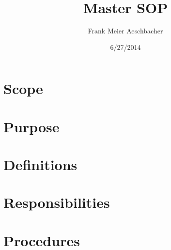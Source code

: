 \documentclass[12pt]{unlsilabsop}
\title{Master SOP}
\date{6/27/2014}
\author{Frank Meier Aeschbacher}
\begin{document}
\maketitle

\section{Scope}

\section{Purpose}

\section{Definitions}

\section{Responsibilities}

\section{Procedures}
\end{document}
